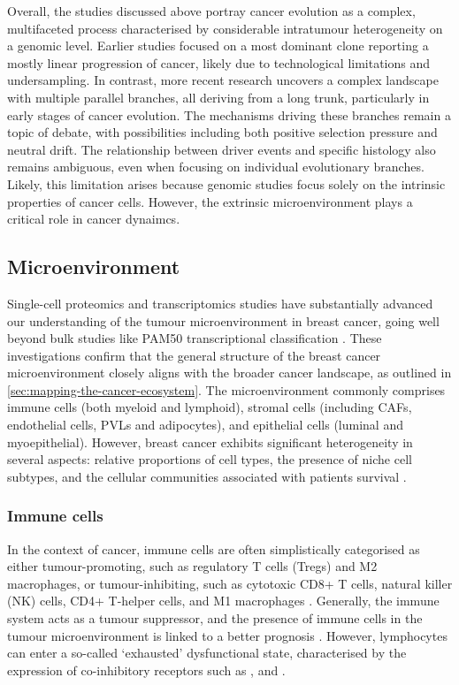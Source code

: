 Overall, the studies discussed above portray cancer evolution as a complex, multifaceted process characterised by considerable intratumour heterogeneity on a genomic level. Earlier studies focused on a most dominant clone reporting a mostly linear progression of cancer, likely due to technological limitations and undersampling. In contrast, more recent research uncovers a complex landscape with multiple parallel branches, all deriving from a long trunk, particularly in early stages of cancer evolution. The mechanisms driving these branches remain a topic of debate, with possibilities including both positive selection pressure and neutral drift. The relationship between driver events and specific histology also remains ambiguous, even when focusing on individual evolutionary branches. Likely, this limitation arises because genomic studies focus solely on the intrinsic properties of cancer cells. However, the extrinsic microenvironment plays a critical role in cancer dynaimcs.

\subsection{Microenvironment}

Single-cell proteomics and transcriptomics studies have substantially advanced our understanding of the tumour microenvironment in breast cancer, going well beyond bulk studies like PAM50 transcriptional classification \parencite{Wu2021-uq,Pal2021-rf,Wagner2019-zp}. These investigations confirm that the general structure of the breast cancer microenvironment closely aligns with the broader cancer landscape, as outlined in \cref{sec:mapping-the-cancer-ecosystem}. The microenvironment commonly comprises immune cells (both myeloid and lymphoid), stromal cells (including \acfp{CAF}, endothelial cells, \acfp{PVL} and adipocytes), and epithelial cells (luminal and myoepithelial). However, breast cancer exhibits significant heterogeneity in several aspects: relative proportions of cell types, the presence of niche cell subtypes, and the cellular communities associated with patients survival \parencite{Jackson2020-em, Danenberg2022-zb}.

\subsubsection*{Immune cells}

In the context of cancer, immune cells are often simplistically categorised as either tumour-promoting, such as regulatory T cells (Tregs) and M2 macrophages, or tumour-inhibiting, such as cytotoxic CD8+ T cells, natural killer (NK) cells, CD4+ T-helper cells, and M1 macrophages . Generally, the immune system acts as a tumour suppressor, and the presence of immune cells in the tumour microenvironment is linked to a better prognosis . However, lymphocytes can enter a so-called `exhausted' dysfunctional state, characterised by the expression of co-inhibitory receptors such as ,  and .

